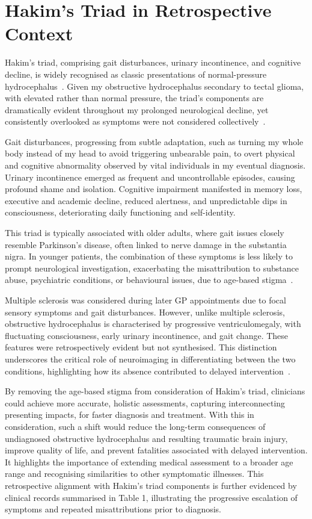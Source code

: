 \documentclass{article}
\begin{document}
\section*{Hakim’s Triad in Retrospective Context}
Hakim’s triad, comprising gait disturbances, urinary incontinence, and cognitive decline, is widely recognised as classic presentations of normal-pressure hydrocephalus~\cite{hakim1965,adams1965}. Given my obstructive hydrocephalus secondary to tectal glioma, with elevated rather than normal pressure, the triad’s components are dramatically evident throughout my prolonged neurological decline, yet consistently overlooked as symptoms were not considered collectively~\cite{rekate2009,kiefer2012}.

Gait disturbances, progressing from subtle adaptation, such as turning my whole body instead of my head to avoid triggering unbearable pain, to overt physical and cognitive abnormality observed by vital individuals in my eventual diagnosis. Urinary incontinence emerged as frequent and uncontrollable episodes, causing profound shame and isolation. Cognitive impairment manifested in memory loss, executive and academic decline, reduced alertness, and unpredictable dips in consciousness, deteriorating daily functioning and self-identity.

This triad is typically associated with older adults, where gait issues closely resemble Parkinson’s disease, often linked to nerve damage in the substantia nigra. In younger patients, the combination of these symptoms is less likely to prompt neurological investigation, exacerbating the misattribution to substance abuse, psychiatric conditions, or behavioural issues, due to age-based stigma~\cite{kiefer2012}.

Multiple sclerosis was considered during later GP appointments due to focal sensory symptoms and gait disturbances. However, unlike multiple sclerosis, obstructive hydrocephalus is characterised by progressive ventriculomegaly, with fluctuating consciousness, early urinary incontinence, and gait change. These features were retrospectively evident but not synthesised. This distinction underscores the critical role of neuroimaging in differentiating between the two conditions, highlighting how its absence contributed to delayed intervention~\cite{msd2026,relkin2005,poca2016}.

By removing the age-based stigma from consideration of Hakim’s triad, clinicians could achieve more accurate, holistic assessments, capturing interconnecting presenting impacts, for faster diagnosis and treatment. With this in consideration, such a shift would reduce the long-term consequences of undiagnosed obstructive hydrocephalus and resulting traumatic brain injury, improve quality of life, and prevent fatalities associated with delayed intervention. It highlights the importance of extending medical assessment to a broader age range and recognising similarities to other symptomatic illnesses. This retrospective alignment with Hakim’s triad components is further evidenced by clinical records summarised in Table 1, illustrating the progressive escalation of symptoms and repeated misattributions prior to diagnosis.
\end{document}
